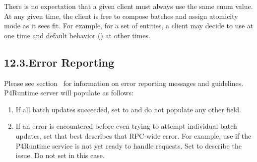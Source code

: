 \documentclass[11pt]{article}
\begin{document}
{%
\noindent{}There is no expectation that a given client must always use the same 
enum value. At any given time, the client is free to compose batches and assign
atomicity mode as it sees fit. For example, for a set of entities, a client may
decide to use  at one time and default behavior
() at other times.%

\subsection{12.3.\hspace*{0.5em}Error Reporting}\label{sec-error-reporting}%

\noindent{}Please see section~ for
information on error reporting messages and guidelines. P4Runtime server will
populate  as follows:%

\begin{enumerate}%

\item{}
If all batch updates succeeded, set  to  and do not
populate any other field.%

\item{}
If an error is encountered before even trying to attempt individual batch
updates, set  that best describes that RPC-wide
error. For example, use  if the P4Runtime service is not yet
ready to handle requests. Set  to describe the issue. Do not
set  in this case.%


\end{enumerate}}
\end{document}
